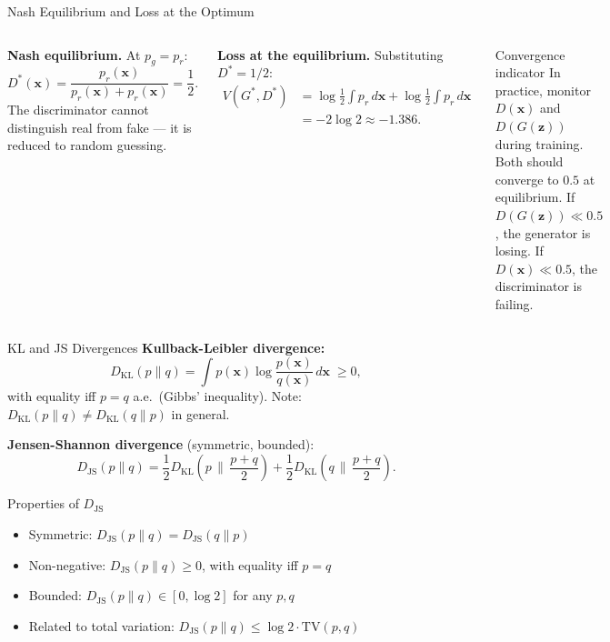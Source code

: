\documentclass[aspectratio=169,11pt]{beamer}
\newcommand{\DKL}{D_{\mathrm{KL}}}
\newcommand{\bx}{\bm{x}}
\newcommand{\bz}{\bm{z}}
\newcommand{\pr}{p_{r}}           %
\newcommand{\pg}{p_{g}}           %
\newcommand{\JS}{D_{\mathrm{JS}}} %
\newcommand{\KL}{D_{\mathrm{KL}}} %
\begin{document}
\begin{frame}{Nash Equilibrium and Loss at the Optimum}
  \begin{columns}[T]
      \textbf{Nash equilibrium.}
      At $\pg=\pr$:
      \[
        D^*(\bx) = \frac{\pr(\bx)}{\pr(\bx)+\pr(\bx)} = \frac{1}{2}.
      \]
      The discriminator cannot distinguish real from fake —
      it is reduced to random guessing.

      \medskip
      \textbf{Loss at the equilibrium.}
      Substituting $D^*=1/2$:
      \begin{align*}
        V(G^*,D^*)
        &= \log\!\tfrac{1}{2}\int\pr\,d\bx
         + \log\!\tfrac{1}{2}\int\pr\,d\bx\\
        &= -2\log 2 \approx -1.386.
      \end{align*}

      \begin{alertblock}{Convergence indicator}
        In practice, monitor $D(\bx)$ and $D(G(\bz))$ during training.
        Both should converge to $0.5$ at equilibrium.
        If $D(G(\bz))\ll 0.5$, the generator is losing.
        If $D(\bx)\ll 0.5$, the discriminator is failing.
      \end{alertblock}
  \end{columns}
\end{frame}

\begin{frame}{KL and JS Divergences}
  \textbf{Kullback-Leibler divergence:}
  \[
    \KL(p\|q) = \int p(\bx)\log\frac{p(\bx)}{q(\bx)}\,d\bx
    \;\ge 0,
  \]
  with equality iff $p=q$ a.e.\ (Gibbs' inequality).
  Note: $\KL(p\|q)\ne\KL(q\|p)$ in general.

  \smallskip
  \textbf{Jensen-Shannon divergence} (symmetric, bounded):
  \[
    \JS(p\|q)
    = \frac{1}{2}\KL\!\left(p\,\Big\|\,\frac{p+q}{2}\right)
    + \frac{1}{2}\KL\!\left(q\,\Big\|\,\frac{p+q}{2}\right).
  \]

  \begin{block}{Properties of $\JS$}
    \begin{itemize}
      \item Symmetric: $\JS(p\|q)=\JS(q\|p)$
      \item Non-negative: $\JS(p\|q)\ge 0$, with equality iff $p=q$
      \item Bounded: $\JS(p\|q)\in[0,\log 2]$ for any $p,q$
      \item Related to total variation: $\JS(p\|q)\le\log 2\cdot\mathrm{TV}(p,q)$
    \end{itemize}
  \end{block}
\end{frame}
\end{document}
